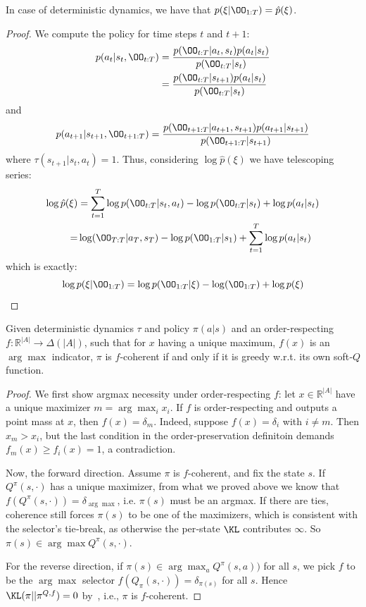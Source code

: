\begin{proposition}
    In case of deterministic dynamics, we have that $p(\xi|\OO_{1:T}) = \hat{p}(\xi)$.
\end{proposition}
\begin{proof}
We compute the policy for time steps $t$ and $t+1$:
\begin{align*}
p(a_t|s_t, \OO_{t:T}) &= \frac{p(\OO_{t:T}|a_t, s_t)p(a_t|s_t)}{p(\OO_{t:T}|s_t)} \\
&= \frac{p(\OO_{t:T}|s_{t+1})p(a_t|s_t)}{p(\OO_{t:T}|s_t)}    
\end{align*}
and
\[
p(a_{t+1}|s_{t+1}, \OO_{t+1:T}) = \frac{p(\OO_{t+1:T}|a_{t+1}, s_{t+1})p(a_{t+1}|s_{t+1})}{p(\OO_{t+1:T}|s_{t+1})}
\]
where $\tau(s_{t+1}|s_{t}, a_{t}) = 1$. Thus, considering $\log \hat{p}(\xi)$ we have telescoping series:
\begin{align*}
\log \hat{p}(\xi) &= \sum_{t = 1}^{T} \log p(\OO_{t:T}|s_{t}, a_{t}) - \log p(\OO_{t:T}|s_{t}) + \log p(a_t|s_t) \\
=& \log(\OO_{T:T}|a_T, s_T) - \log p(\OO_{1:T}|s_1) + \sum_{t = 1}^T \log p(a_t|s_t)
\end{align*}
which is exactly:
\[
\log p(\xi|\OO_{1:T}) = \log p(\OO_{1:T}|\xi) - \log(\OO_{1:T}) + \log p(\xi)
\]
\end{proof}
\begin{proposition}
    Given deterministic dynamics $\tau$ and policy $\pi(a|s)$ and an order-respecting $f: \mathbb{R}^{|A|} \to \Delta(|A|)$, such that for $x$ having a unique maximum, $f(x)$ is an $\arg\max$ indicator, $\pi$ is $f$-coherent if and only if it is greedy w.r.t. its own soft‑$Q$ function.
\end{proposition}
\begin{proof}

We first show argmax necessity under order‑respecting $f$: let $x\in\mathbb{R}^{|A|}$ have a unique maximizer $m=\arg\max_i x_i$. If $f$ is order‑respecting and outputs a point mass at $x$, then $f(x)=\delta_m$. Indeed, suppose $f(x)=\delta_i$ with $i\neq m$. Then $x_m>x_i$, but the last condition in the order‑preservation definitoin demands $f_m(x)\ge f_i(x)=1$, a contradiction.

Now, the forward direction. Assume $\pi$ is $f$-coherent, and fix the state $s$. If $Q^\pi(s,\cdot)$ has a unique maximizer, from what we proved above we know that $f(Q^\pi(s,\cdot)) = \delta_{\arg\max}$, i.e. $\pi(s)$ must be an argmax. If there are ties, coherence still forces $\pi(s)$ to be one of the maximizers, which is consistent with the selector’s tie‑break, as otherwise the per‑state $\KL$ contributes $\infty$. So $\pi(s)\in\arg\max Q^\pi(s,\cdot)$.

For the reverse direction, if $\pi(s)\in\arg\max_a Q^\pi(s,a))$ for all $s$, we pick $f$ to be the $\arg\max$ selector $f(Q_\pi(s,\cdot))=\delta_{\pi(s)}$ for all $s$. Hence $\KL(\pi||\pi^{Q,f})=0$ by~, i.e., $\pi$ is $f$-coherent.

\end{proof}

